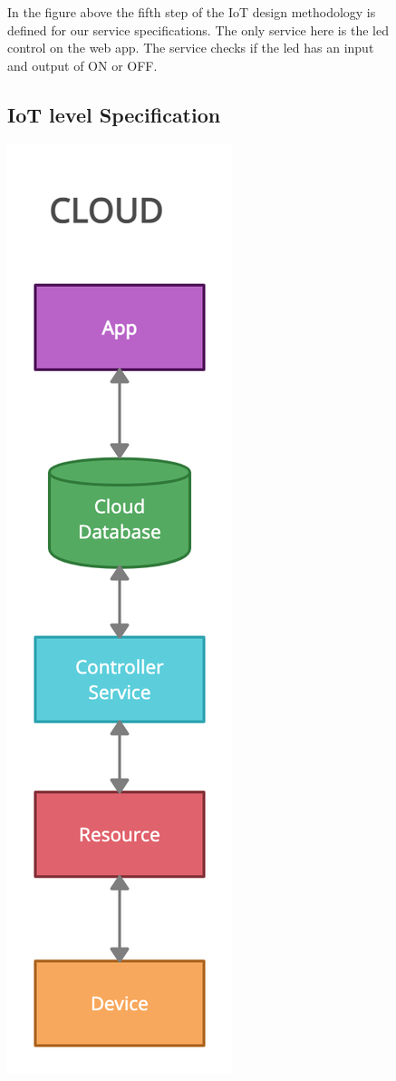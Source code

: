 \documentclass{report}
\begin{document}
\begin{figure}
    \caption{In the figure above the fifth step of the IoT design methodology is defined for our service specifications. The only service here is the led control on the web app. The service checks if the led has an input and output of ON or OFF.}
    \label{fig:image4}
\end{figure}

\begin{figure}
\subsection{IoT level Specification}
    \centering
    \includegraphics[scale=0.2]{images/step6.png}

\end{figure}
\end{document}
